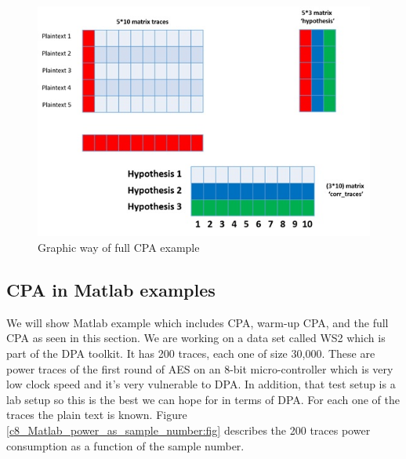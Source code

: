 \begin{figure}[H]
    \centering
    \includegraphics[width=1.0\textwidth]{images/chapter8/cpa_example.jpg}
    \caption{Graphic way of full CPA example} \label{c8_cpa_example:fig}
\end{figure}

\subsection{CPA in Matlab examples}\label{c6_Matlab_CPA_example:subsec}
We will show Matlab example which includes CPA, warm-up CPA, and the full CPA as seen in this section.
We are working on a data set called WS2 which is part of the DPA toolkit. It has 200 traces, each one of size 30,000. These are power traces of the first round of AES on an 8-bit micro-controller which is very low clock speed and it’s very vulnerable to DPA. In addition, that test setup is a lab setup so this is the best we can hope for in terms of DPA. For each one of the traces the plain text is known. 
Figure \ref{c8_Matlab_power_as_sample_number:fig} describes the 200 traces power consumption as a function of the sample number. 


